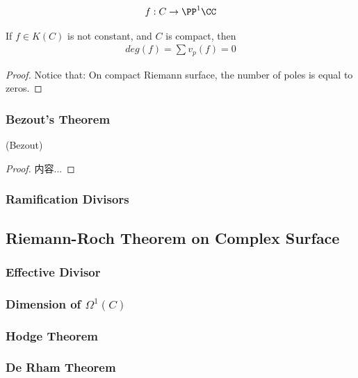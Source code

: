 \documentclass[Total.tex]{subfiles}
\begin{document}
				\begin{gather*}
					f:C\rightarrow \PP^1 \CC
				\end{gather*}
				
				\begin{theorem}
					If $f\in K(C)$ is not constant, and $C$ is compact, then 
					\begin{gather*}
						deg(f)=\sum v_p(f)=0
					\end{gather*}
				\end{theorem}
				\begin{proof}
					Notice that: On compact Riemann surface, the number of poles is equal to zeros. 
				\end{proof}
				
				\subsubsection{Bezout's Theorem}
				\begin{theorem}
					(Bezout)
				\end{theorem}
				\begin{proof}
					内容...
				\end{proof}
				\subsubsection{Ramification Divisors}
			\subsection{Riemann-Roch Theorem on Complex Surface}
				\subsubsection{Effective Divisor}
					\begin{Def}
						
					\end{Def}
					
				\subsubsection{Dimension of $\Omega^1(C)$}
				
				\subsubsection{Hodge Theorem}
				
				\subsubsection{De Rham Theorem}
\end{document}
